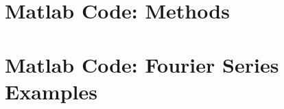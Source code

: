\documentclass[00main.tex]{subfiles}
\begin{document}
\chapter{Matlab Code: Methods}

















\chapter{Matlab Code: Fourier Series Examples}







\end{document}
